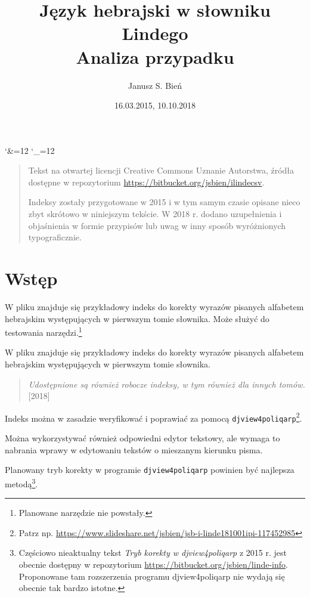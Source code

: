 \documentclass[12]{mwart}
\title{Język hebrajski w słowniku Lindego\\Analiza przypadku}
\author{Janusz S. Bień}
\date{16.03.2015, 10.10.2018}
\begin{document}
\maketitle

\catcode`\&=12
\catcode`\_=12

\begin{quote}
  Tekst na otwartej licencji Creative Commons Uznanie Autorstwa,
  źródła dostępne w repozytorium
  \url{https://bitbucket.org/jsbien/ilindecsv}.

  \bigskip
  Indeksy zostały przygotowane w 2015 i w tym samym czasie opisane
  nieco zbyt skrótowo w niniejszym tekście. W 2018 r. dodano
  uzupełnienia i objaśnienia w formie przypisów lub uwag w inny sposób
  wyróżnionych typograficznie.
\end{quote}

\section{Wstęp}
\label{sec:wstp}

W pliku  znajduje się przykładowy indeks do korekty
wyrazów pisanych alfabetem hebrajskim występujących w pierwszym tomie
słownika. Może służyć do testowania narzędzi.\footnote{Planowane
  narzędzie nie powstały.}

W pliku  znajduje się przykładowy indeks do korekty
wyrazów pisanych alfabetem hebrajskim występujących w pierwszym tomie
słownika. 

\begin{quote}
  \textit{Udostępnione są również robocze indeksy, w tym również dla
    innych tomów.}[2018]
\end{quote}

Indeks można w zasadzie weryfikować i poprawiać za pomocą
\texttt{djview4poliqarp}\footnote{Patrz
  np. \url{https://www.slideshare.net/jsbien/jsb-i-linde181001ipi-117452985}}.

Można wykorzystywać również odpowiedni edytor tekstowy, ale wymaga to
nabrania wprawy w edytowaniu tekstów o mieszanym kierunku pisma.

Planowany tryb korekty w programie \texttt{djview4poliqarp} powinien
być najlepsza metodą\footnote{Częściowo nieaktualny tekst \textit{Tryb korekty w
    djview4poliqarp} z 2015 r. jest obecnie dostępny w repozytorium
  \url{https://bitbucket.org/jsbien/linde-info}. Proponowane tam
  rozszerzenia programu \textsf{djview4poliqarp} nie wydają się
  obecnie tak bardzo istotne.}.
\end{document}
